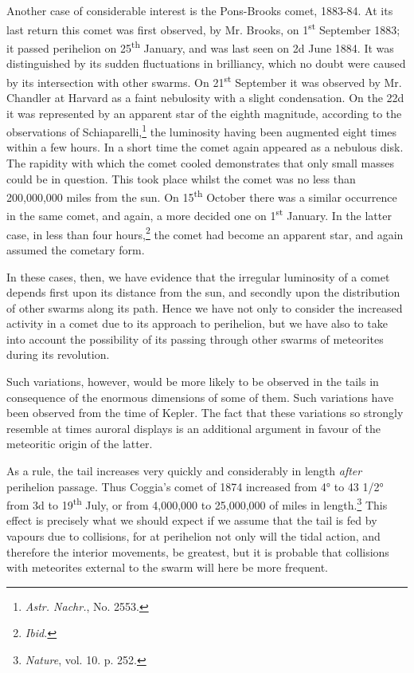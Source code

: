 \documentclass[a4paper, 12pt, oneside, polutonikogreek, english]{article}
\begin{document}
Another case of considerable interest is the Pons-Brooks comet, 1883-84. At its last return this comet was first observed, by Mr. Brooks, on 1\textsuperscript{st} September 1883; it passed perihelion on 25\textsuperscript{th} January, and was last seen on 2d June 1884. It was distinguished by its sudden fluctuations in brilliancy, which no doubt were caused by its intersection with other swarms. On 21\textsuperscript{st} September it was observed by Mr. Chandler at Harvard as a faint nebulosity with a slight condensation. On the 22d it was represented by an apparent star of the eighth magnitude, according to the observations of Schiaparelli,\footnote{\emph{Astr. Nachr.}, No. 2553.} the luminosity having been augmented eight times within a few hours. In a short time the comet again appeared as a nebulous disk. The rapidity with which the comet cooled demonstrates that only small masses could be in question. This took place whilst the comet was no less than 200,000,000 miles from the sun. On 15\textsuperscript{th} October there was a similar occurrence in the same comet, and again, a more decided one on 1\textsuperscript{st} January. In the latter case, in less than four hours,\footnote{\emph{Ibid.}} the comet had become an apparent star, and again assumed the cometary form.

In these cases, then, we have evidence that the irregular luminosity of a comet depends first upon its distance from the sun, and secondly upon the distribution of other swarms along its path. Hence we have not only to consider the increased activity in a comet due to its approach to perihelion, but we have also to take into account the possibility of its passing through other swarms of meteorites during its revolution.

Such variations, however, would be more likely to be observed in the tails in consequence of the enormous dimensions of some of them. Such variations have been observed from the time of Kepler. The fact that these variations so strongly resemble at times auroral displays is an additional argument in favour of the meteoritic origin of the latter.

As a rule, the tail increases very quickly and considerably in length \emph{after} perihelion passage. Thus Coggia's comet of 1874 increased from 4° to 43 1/2° from 3d to 19\textsuperscript{th} July, or from 4,000,000 to 25,000,000 of miles in length.\footnote{\emph{Nature}, vol. 10. p. 252.} This effect is precisely what we should expect if we assume that the tail is fed by vapours due to collisions, for at perihelion not only will the tidal action, and therefore the interior movements, be greatest, but it is probable that collisions with meteorites external to the swarm will here be more frequent.
\end{document}
